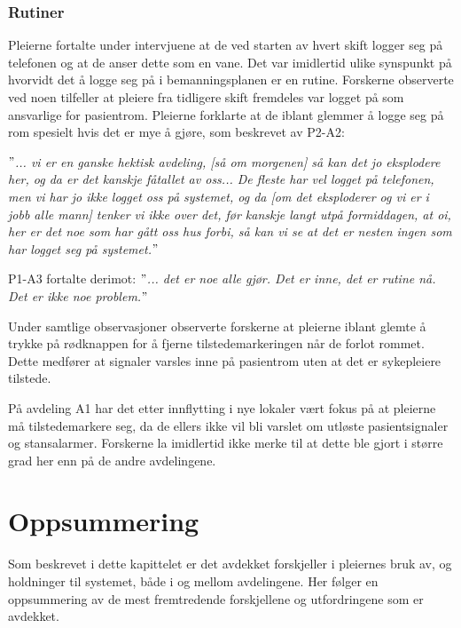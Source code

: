 \subsubsection{Rutiner}
Pleierne fortalte under intervjuene at de ved starten av hvert skift logger seg på telefonen og at de anser dette som en vane. Det var imidlertid ulike synspunkt på hvorvidt det å logge seg på i bemanningsplanen er en rutine. Forskerne observerte ved noen tilfeller at pleiere fra tidligere skift fremdeles var logget på som ansvarlige for pasientrom. Pleierne forklarte at de iblant glemmer å logge seg på rom spesielt hvis det er mye å gjøre, som beskrevet av P2-A2:

\noindent
\textit{$"$... vi er en ganske hektisk avdeling, [så om morgenen] så kan det jo eksplodere her, og da er det kanskje fåtallet av oss... De fleste har vel logget på telefonen, men vi har jo ikke logget oss på systemet, og da [om det eksploderer og vi er i jobb alle mann] tenker vi ikke over det, før kanskje langt utpå formiddagen, at oi, her er det noe som har gått oss hus forbi, så kan vi se at det er nesten ingen som har logget seg på systemet.$"$}

\noindent
P1-A3 fortalte derimot: \textit{$"$... det er noe alle gjør. Det er inne, det er rutine nå. Det er ikke noe problem.$"$} 

\noindent
Under samtlige observasjoner observerte forskerne at pleierne iblant glemte å trykke på rødknappen for å fjerne tilstedemarkeringen når de forlot rommet. Dette medfører at signaler varsles inne på pasientrom uten at det er sykepleiere tilstede.

\noindent
På avdeling A1 har det etter innflytting i nye lokaler vært fokus på at pleierne må tilstedemarkere seg, da de ellers ikke vil bli varslet om utløste pasientsignaler og stansalarmer. Forskerne la imidlertid ikke merke til at dette ble gjort i større grad her enn på de andre avdelingene.  

\section{Oppsummering}
Som beskrevet i dette kapittelet er det avdekket forskjeller i pleiernes bruk av, og holdninger til systemet, både i og mellom avdelingene. Her følger en oppsummering av de mest fremtredende forskjellene og utfordringene som er avdekket.

